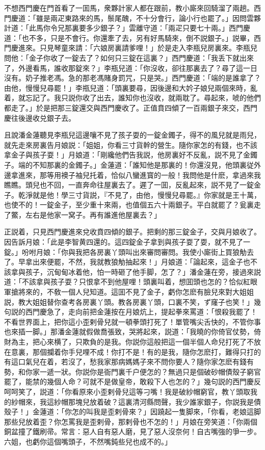 不想西門慶在門首看了一囬馬，衆夥計家人都在跟前，教小廝來回騎溜了兩趟。西門慶道：「雖是兩疋東路來的馬，鬃尾醜，不十分會行，論小行也罷了。」因問雲夥計道：「此馬你令兄那裏要多少銀子？」雲離守道：「兩疋只要七十兩。」西門慶道：「也不多，只是不會行。你還牽了去，另有好馬騎來，倒不説銀子。」説畢，西門慶進來。只見琴童來請：「六娘房裏請爹哩！」於是走入李瓶兒房裏來。李瓶兒問他：「金子你收了一錠去了？如何只三錠在這裏？」西門慶道：「我丢下就出來了，外邊看馬，誰收那錠來？」李瓶兒道：「你沒收，卻往那裏去了？尋了這一日沒有。奶子推老馮。急的那老馮賭身罰咒，只是哭。」西門慶道：「端的是誰拿了？由他，慢慢兒尋罷！」李瓶兒道：「頭裏要尋，因後邊和大妗子娘兒兩個來時，亂着，就忘記了。我只説你收了出去，誰知你也沒收，就兩耽了。尋起來，唬的他們都走了。」於是把那三錠還交與西門慶收了。正值賁四傾了一百兩銀子來交，西門慶往後邊收兑銀子去。

且說潘金蓮聽見李瓶兒這邊嚷不見了孩子耍的一錠金鐲子，得不的風兒就是雨兒，就先走來房裏告月娘説：「姐姐，你看三寸貨幹的營生。隨你家怎的有錢，也不該拿金子與孩子耍！」月娘道：「剛纔他們告我説，他房裏好不反亂，説不見了金鐲子。端的不知那裏的金鐲子。」金蓮道：「誰知他是那裏的！你還沒見，他頭裏従外邊拿進來，那等用襖子袖兒托着，恰似八蠻進寳的一般！我問他是什麽，拿過來我瞧瞧。頭兒也不回，一直奔命往屋裏去了。遲了一囬，反亂起來，説不見了一錠金子。乾淨就是他！學三寸貨説，『不見了，由他，慢慢兒尋罷。』你家就是王十萬，也使不的！一錠金子，至少重十來兩，也值個五六十兩銀子。平白就罷了？瓮裏走了鱉，左右是他家一窝子。再有誰進他屋裏去？」

正説着，只見西門慶進來兌收賁四傾的銀子。把剩的那三錠金子，交與月娘收了。因告訴月娘：「此是李智黄四還的。這四錠金子拿到與孩子耍了耍，就不見了一錠。」吩咐月娘：「你與我把各房裏丫頭叫出來審問審問。我使小廝街上買狼觔去了。早拿出來便罷，不然，我就教狼觔抽起來！」月娘道：「論起來，這金子也不該拿與孩子，沉甸甸冰着他，怕一時砸了他手脚，怎了？」潘金蓮在旁，接過來説道：「不該拿與孩子耍？只恨拿不到他屋哩！頭裏叫着，想囬頭也怎的？恰似紅眼軍搶將來的，不敎一個人兒知道。這囬不見了金子，虧你怎麽有臉兒來對大姐姐説，教大姐姐替你查考各房裏丫頭。教各房裏丫頭，口裏不笑，ず窿子也笑！」幾句説的西門慶急了，走向前把金蓮按在月娘炕上，提起拳來罵道：「恨殺我罷了！不看世界面上，把你這小歪剌骨兒就一頓拳頭打死了！單管嘴尖舌快的，不管你事也來插一脚。」那潘金蓮就假做喬張致，哭將起來，説道：「我曉的你倚官仗勢，倚財為主，把心來横了，只欺負的是我。你説你這般把這一個半個人命兒打死了不放在意裏，那個攔着你手兒哩不成！你打不是！有的是我，隨你怎麽打，難得只打的有這口氣兒在着，若沒了，愁我家那病媽媽子來不問你要人？隨你家怎麽有錢有勢，和你家一遞一狀。你説你是衙門裏千户便怎的？無過只是個破砂帽債殼子窮官罷了，能禁的幾個人命？可就不是做皇帝，敢殺下人也怎的？」幾句説的西門慶反呵呵笑了，説道：「你看原來小歪剌骨兒這等刁嘴！我是破紗帽窮官，教丫頭取我的紗帽來，我這紗帽那塊兒放着破？這裏清河縣問聲，我少誰家銀子，你説我是債殼子！」金蓮道：「你怎的叫我是歪剌骨來？」因蹺起一隻脚來，「你看，老娘這脚那些兒放着歪？你怎罵我是歪剌骨，那剌骨也不怎的！」月娘在旁笑道：「你兩個銅盆撞了鐵刷帚。常言：惡人自有惡人磨，見了惡人沒奈何！自古嘴強的爭一步。六姐，也虧你這個嘴頭子，不然嘴鈍些兒也成不的。」

